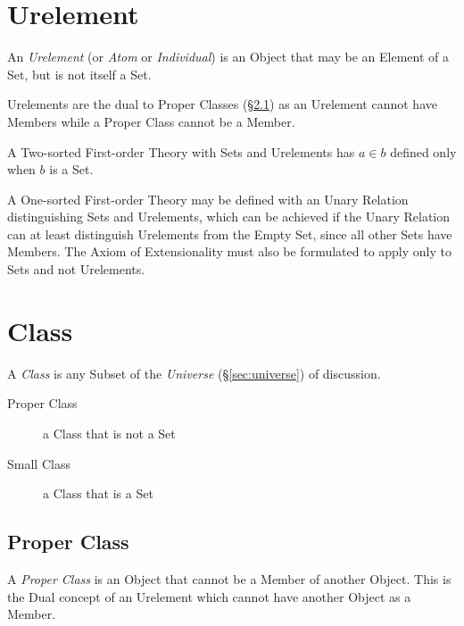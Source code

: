 \section{Urelement}\label{sec:urelement}

An \emph{Urelement} (or \emph{Atom} or \emph{Individual}) is an Object
that may be an Element of a Set, but is not itself a Set.

Urelements are the dual to Proper Classes (\S\ref{sec:proper_class})
as an Urelement cannot have Members while a Proper Class cannot be a
Member.

A Two-sorted First-order Theory with Sets and Urelements has $a \in b$
defined only when $b$ is a Set.

A One-sorted First-order Theory may be defined with an Unary Relation
distinguishing Sets and Urelements, which can be achieved if the Unary
Relation can at least distinguish Urelements from the Empty Set, since
all other Sets have Members. The Axiom of Extensionality must also be
formulated to apply only to Sets and not Urelements.



\section{Class}\label{sec:class}

A \emph{Class} is any Subset of the \emph{Universe}
(\S\ref{sec:universe}) of discussion.

\begin{description}
  \item [Proper Class] a Class that is not a Set
  \item [Small Class] a Class that is a Set
\end{description}



\subsection{Proper Class}\label{sec:proper_class}

A \emph{Proper Class} is an Object that cannot be a Member of another
Object. This is the Dual concept of an Urelement which cannot have
another Object as a Member.



